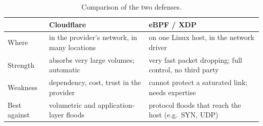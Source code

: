 \begin{table}[ht]
	\centering
	\small
	\begin{tabularx}{\textwidth}{@{}l>{\raggedright\arraybackslash}X>{\raggedright\arraybackslash}X@{}}
		\toprule
		 & Cloudflare & eBPF / XDP \\
		\midrule
		Where & in the provider's network, in many locations & on one Linux host, in the network driver \\
		Strength & absorbs very large volumes; automatic & very fast packet dropping; full control, no third party \\
		Weakness & dependency, cost, trust in the provider & cannot protect a saturated link; needs expertise \\
		Best against & volumetric and application-layer floods & protocol floods that reach the host (e.g.\ SYN, UDP) \\
		\bottomrule
	\end{tabularx}
	\caption{Comparison of the two defenses.}
	\label{tab:defcompare}
\end{table}
